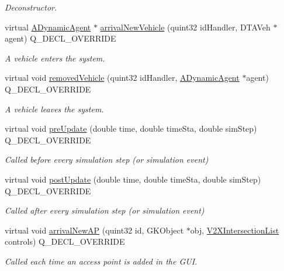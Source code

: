\begin{DoxyCompactItemize}
\begin{DoxyCompactList}\small\item\em Deconstructor. \end{DoxyCompactList}\item 
virtual \hyperlink{classADynamicAgent}{A\+Dynamic\+Agent} $\ast$ \hyperlink{classFlourishV2XFramework_a47368514f7814d3d6db4cf8aaf049d3b}{arrival\+New\+Vehicle} (quint32 id\+Handler, D\+T\+A\+Veh $\ast$agent) Q\+\_\+\+D\+E\+C\+L\+\_\+\+O\+V\+E\+R\+R\+I\+DE
\begin{DoxyCompactList}\small\item\em A vehicle enters the system. \end{DoxyCompactList}\item 
virtual void \hyperlink{classFlourishV2XFramework_a60ff1aaea1448c9a05892597898c48a6}{removed\+Vehicle} (quint32 id\+Handler, \hyperlink{classADynamicAgent}{A\+Dynamic\+Agent} $\ast$agent) Q\+\_\+\+D\+E\+C\+L\+\_\+\+O\+V\+E\+R\+R\+I\+DE
\begin{DoxyCompactList}\small\item\em A vehicle leaves the system. \end{DoxyCompactList}\item 
virtual void \hyperlink{classFlourishV2XFramework_a7dc6777db5dc693c67733e50af76c855}{pre\+Update} (double time, double time\+Sta, double sim\+Step) Q\+\_\+\+D\+E\+C\+L\+\_\+\+O\+V\+E\+R\+R\+I\+DE
\begin{DoxyCompactList}\small\item\em Called before every simulation step (or simulation event) \end{DoxyCompactList}\item 
virtual void \hyperlink{classFlourishV2XFramework_aa1417bf763cc7b9278df12dfda185010}{post\+Update} (double time, double time\+Sta, double sim\+Step) Q\+\_\+\+D\+E\+C\+L\+\_\+\+O\+V\+E\+R\+R\+I\+DE
\begin{DoxyCompactList}\small\item\em Called after every simulation step (or simulation event) \end{DoxyCompactList}\item 
virtual void \hyperlink{classFlourishV2XFramework_a7229f12d53f55bf2486612c97785aa5b}{arrival\+New\+AP} (quint32 id, G\+K\+Object $\ast$obj, \hyperlink{group__V2XFramework_ga22a1c07fac7df77efff8f0d4f6f3c248}{V2\+X\+Intersection\+List} controls) Q\+\_\+\+D\+E\+C\+L\+\_\+\+O\+V\+E\+R\+R\+I\+DE
\begin{DoxyCompactList}\small\item\em Called each time an access point is added in the G\+UI. \end{DoxyCompactList}\end{DoxyCompactItemize}
